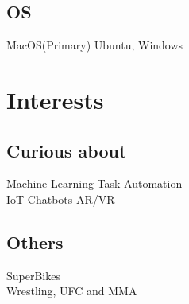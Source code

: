 \documentclass[a4paper]{deedy-resume} %
\begin{document}
\begin{minipage}[t]{0.33\textwidth}
\subsection{OS}

\textbullet{} MacOS(Primary)
\textbullet{} Ubuntu, Windows

\sectionspace %


\section{Interests}

\subsection{Curious about}
\textbullet{} Machine Learning \textbullet{} Task Automation\\
\textbullet{} IoT \textbullet{} Chatbots \textbullet{} AR/VR

\sectionspace %

\subsection{Others}
\textbullet{} SuperBikes\\
\textbullet{} Wrestling, UFC and MMA




\end{minipage} %
\hfill
%
%
\end{document}
